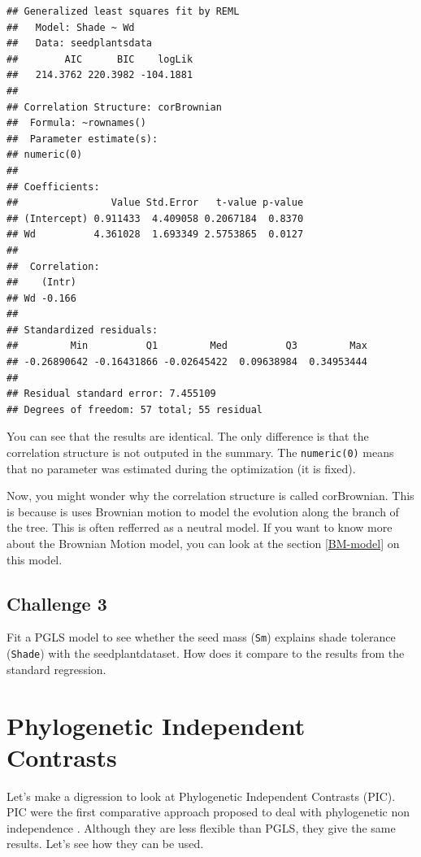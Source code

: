 \documentclass[
]{book}
\begin{document}
\begin{verbatim}
## Generalized least squares fit by REML
##   Model: Shade ~ Wd 
##   Data: seedplantsdata 
##        AIC      BIC    logLik
##   214.3762 220.3982 -104.1881
## 
## Correlation Structure: corBrownian
##  Formula: ~rownames() 
##  Parameter estimate(s):
## numeric(0)
## 
## Coefficients:
##                Value Std.Error   t-value p-value
## (Intercept) 0.911433  4.409058 0.2067184  0.8370
## Wd          4.361028  1.693349 2.5753865  0.0127
## 
##  Correlation: 
##    (Intr)
## Wd -0.166
## 
## Standardized residuals:
##         Min          Q1         Med          Q3         Max 
## -0.26890642 -0.16431866 -0.02645422  0.09638984  0.34953444 
## 
## Residual standard error: 7.455109 
## Degrees of freedom: 57 total; 55 residual
\end{verbatim}

You can see that the results are identical. The only difference is that the correlation structure is not outputed in the summary. The \texttt{numeric(0)} means that no parameter was estimated during the optimization (it is fixed).

Now, you might wonder why the correlation structure is called corBrownian. This is because is uses Brownian motion to model the evolution along the branch of the tree. This is often refferred as a neutral model. If you want to know more about the Brownian Motion model, you can look at the section \ref{BM-model} on this model.

\hypertarget{challenge-3}{%
\section{Challenge 3}\label{challenge-3}}

Fit a PGLS model to see whether the seed mass (\texttt{Sm}) explains shade tolerance (\texttt{Shade}) with the seedplantdataset. How does it compare to the results from the standard regression.

\hypertarget{pic}{%
\chapter{Phylogenetic Independent Contrasts}\label{pic}}

Let's make a digression to look at Phylogenetic Independent Contrasts (PIC). PIC were the first comparative approach proposed to deal with phylogenetic non independence \citep{felsenstein1985phylogenies}. Although they are less flexible than PGLS, they give the same results. Let's see how they can be used.
\end{document}
